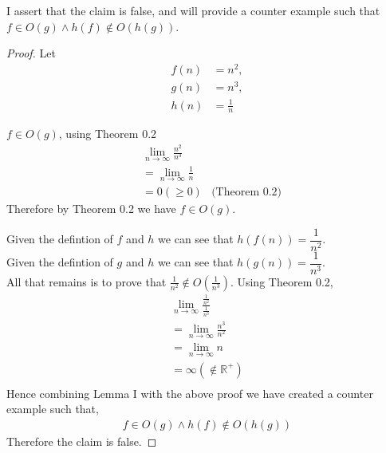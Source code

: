 \documentclass[12pt]{article}
\newcommand{\R}{\mathbb{R}}
\newenvironment{lemma}[2][Lemma]{\begin{trivlist}
\item[\hskip \labelsep {\bfseries #1}\hskip \labelsep {\bfseries #2.}]}{\end{trivlist}}
\newenvironment{question}[2][Question]{\begin{trivlist}
\item[\hskip \labelsep {\bfseries #1}\hskip \labelsep {\bfseries #2.}]}{\end{trivlist}}
\begin{document}
\begin{question}{3}
  I assert that the claim is false, and will provide a counter example such
  that $f \in O(g) \land h(f) \notin O(h(g))$.
  \begin{proof}
    Let
    \begin{align*}
      f(n) &= n^{2},\\
      g(n) &= n^{3},\\
      h(n) &= \frac{1}{n}
    \end{align*}

    \begin{lemma}{I} $f \in O(g)$, using Theorem 0.2
      \begin{align*}
        & \lim_{n\to\infty} \frac{n^{2}}{n^{3}} &  \\
        & = \lim_{n\to\infty} \frac{1}{n}       & \\
        & = 0 (\geq 0)                            & \text{(Theorem 0.2)}
      \end{align*}
      Therefore by Theorem 0.2 we have $f \in O(g)$.
    \end{lemma}

    Given the defintion of $f$ and $h$ we can see that $h(f(n)) = \dfrac{1}{n^{2}}$.\\
    Given the defintion of $g$ and $h$ we can see that $h(g(n)) = \dfrac{1}{n^{3}}$.\\
    All that remains is to prove that $\frac{1}{n^{2}}\notin O(\frac{1}{n^{3}})$.  Using Theorem 0.2,
    \begin{align*}
    & \lim_{n\to\infty} \frac{\frac{1}{n^{2}}}{\frac{1}{n^{3}}} &\\
        & = \lim_{n\to\infty} \frac{n^3}{n^2} &\\
        & = \lim_{n\to\infty} n &\\
        & = \infty (\notin \R^{+}) &\\
    \end{align*}
    Hence combining Lemma I with the above proof we have created a counter example
    such that,
    \begin{align*}
      f \in O(g) \land h(f) \notin O(h(g))
    \end{align*}
    Therefore the claim is false.
  \end{proof}
\end{question}
\end{document}

